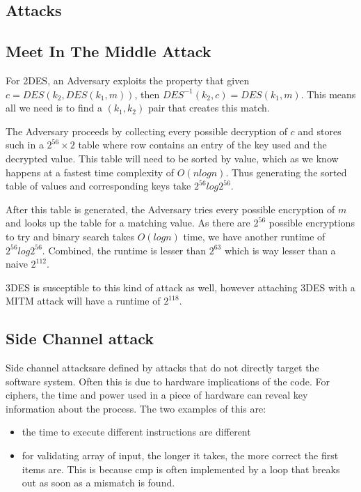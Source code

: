 \documentclass{article}
\begin{document}
\begin{multicols}{2}
\section{Attacks}

\subsection{Meet In The Middle Attack}

For 2DES, an Adversary exploits the property that given $c = DES(k_2,DES(k_1,m))$, then $DES^{-1}(k_2,c) = DES(k_1,m)$. This means all we need is to find a $(k_1, k_2)$ pair that creates this match.

The Adversary proceeds by collecting every possible decryption of $c$ and stores such in a $2^{56} \times 2$ table where row contains an entry of the key used and the decrypted value. This table will need to be sorted by value, which as we know happens at a fastest time complexity of $O(nlogn)$. Thus generating the sorted table of values and corresponding keys take $2^{56}log2^{56}$. 

After this table is generated, the Adversary tries every possible encryption of $m$ and looks up the table for a matching value. As there are $2^{56}$ possible encryptions to try and binary search takes $O(logn)$ time, we have another runtime of $2^{56}log2^{56}$. Combined, the runtime is lesser than $2^{63}$ which is way lesser than a naive $2^{112}$. 

3DES is susceptible to this kind of attack as well, however attaching 3DES with a MITM attack will have a runtime of $2^{118}$.

\subsection{Side Channel attack}

Side channel attacksare defined by attacks that do not directly target the software system. Often this is due to hardware implications of the code. For ciphers, the time and power used in a piece of hardware can reveal key information about the process. The two examples of this are:

\begin{itemize}
    \item the time to execute different instructions are different
    \item for validating array of input, the longer it takes, the more correct the first items are. This is because cmp is often implemented by a loop that breaks out as soon as a mismatch is found.
\end{itemize}


\end{multicols}
\end{document}
